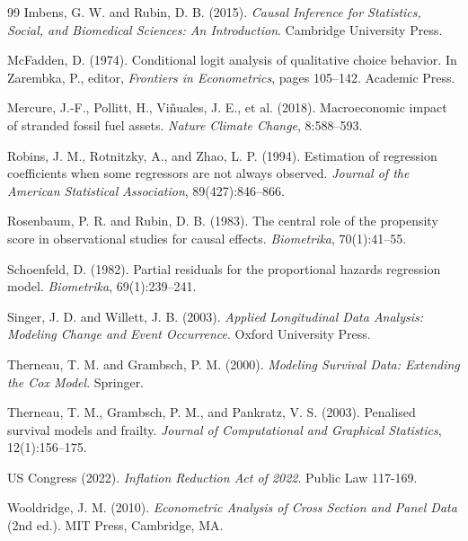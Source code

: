 \documentclass[11pt,a4paper]{article}
\begin{document}
\begin{thebibliography}{99}
Imbens, G. W. and Rubin, D. B. (2015). \textit{Causal Inference for Statistics, Social, and Biomedical Sciences: An Introduction}. Cambridge University Press.

McFadden, D. (1974). Conditional logit analysis of qualitative choice behavior. In Zarembka, P., editor, \textit{Frontiers in Econometrics}, pages 105--142. Academic Press.

Mercure, J.-F., Pollitt, H., Vi\~{n}uales, J. E., et al. (2018). Macroeconomic impact of stranded fossil fuel assets. \textit{Nature Climate Change}, 8:588--593.

Robins, J. M., Rotnitzky, A., and Zhao, L. P. (1994). Estimation of regression coefficients when some regressors are not always observed. \textit{Journal of the American Statistical Association}, 89(427):846--866.

Rosenbaum, P. R. and Rubin, D. B. (1983). The central role of the propensity score in observational studies for causal effects. \textit{Biometrika}, 70(1):41--55.

Schoenfeld, D. (1982). Partial residuals for the proportional hazards regression model. \textit{Biometrika}, 69(1):239--241.

Singer, J. D. and Willett, J. B. (2003). \textit{Applied Longitudinal Data Analysis: Modeling Change and Event Occurrence}. Oxford University Press.

Therneau, T. M. and Grambsch, P. M. (2000). \textit{Modeling Survival Data: Extending the Cox Model}. Springer.

Therneau, T. M., Grambsch, P. M., and Pankratz, V. S. (2003). Penalised survival models and frailty. \textit{Journal of Computational and Graphical Statistics}, 12(1):156--175.

US Congress (2022). \textit{Inflation Reduction Act of 2022}. Public Law 117-169.

Wooldridge, J. M. (2010). \textit{Econometric Analysis of Cross Section and Panel Data} (2nd ed.). MIT Press, Cambridge, MA.

\end{thebibliography}
\end{document}
